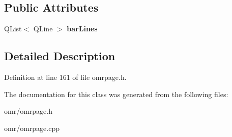 \subsection*{Public Attributes}
\begin{DoxyCompactItemize}
\item 
\mbox{\label{class_ms_1_1_omr_system_ae76171f0fc2b0631df00e9bd3a6930b3}} 
Q\+List$<$ Q\+Line $>$ {\bfseries bar\+Lines}
\end{DoxyCompactItemize}


\subsection{Detailed Description}


Definition at line 161 of file omrpage.\+h.



The documentation for this class was generated from the following files\+:\begin{DoxyCompactItemize}
\item 
omr/omrpage.\+h\item 
omr/omrpage.\+cpp\end{DoxyCompactItemize}
